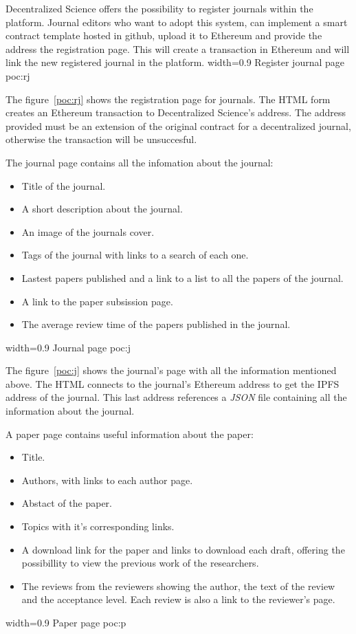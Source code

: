 
Decentralized Science offers the possibility to register journals within the
platform. Journal editors who want to adopt this system, can implement a smart
contract template hosted in github, upload it to Ethereum and provide the
address the registration page. This will create a transaction in Ethereum and
will link the new registered journal in the platform. %
{width=0.9\linewidth}%
{Register journal page}%
{poc:rj}

The figure~\ref{poc:rj} shows the registration page for journals. The HTML form
creates an Ethereum transaction to Decentralized Science's address. The address
provided must be an extension of the original contract for a decentralized
journal, otherwise the transaction will be unsuccesful. 

The journal page contains all the infomation about the journal:
\begin{itemize}
\item Title of the journal.
\item A short description about the journal.
\item An image of the journals cover.
\item Tags of the journal with links to a search of each one.
\item Lastest papers published and a link to a list to all the papers of the
  journal.
\item A link to the paper subsission page.
\item The average review time of the papers published in the journal.
\end{itemize}

%
{width=0.9\linewidth}%
{Journal page}%
{poc:j}

The figure~\ref{poc:j} shows the journal's page with all the information
mentioned above. The HTML connects to the journal's Ethereum address to get the
IPFS address of the journal. This last address references a \emph{JSON} file
containing all the information about the journal.



A paper page contains useful information about the paper:
\begin{itemize}
\item Title.
\item Authors, with links to each author page.
\item Abstact of the paper.
\item Topics with it's corresponding links.
\item A download link for the paper and links to download each draft, offering
  the possibillity to view the previous work of the researchers.
\item The reviews from the reviewers showing the author, the text of the review
  and the acceptance level. Each review is also a link to the reviewer's page.
\end{itemize}
%
{width=0.9\linewidth}%
{Paper page}%
{poc:p}

